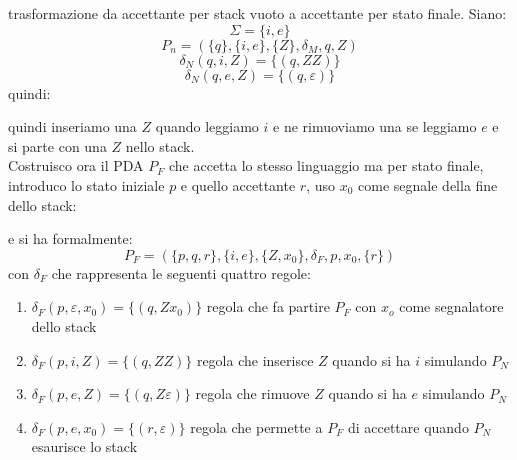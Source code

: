 \documentclass[a4paper,12pt, oneside]{book}
\begin{document}
\begin{esempio}
trasformazione da accettante per stack vuoto a accettante per stato finale. Siano:
$$\Sigma=\{i,e\}$$
$$P_n=(\{q\}, \{i,e\},\{Z\},\delta_M,q,Z)$$
$$\delta_N(q,i,Z)=\{(q,ZZ)\}$$
$$\delta_N(q,e,Z)=\{(q,\varepsilon)\}$$
quindi:
\begin{center}
\end{center}
quindi inseriamo una $Z$ quando leggiamo $i$ e ne rimuoviamo una se leggiamo $e$ e si parte con una $Z$ nello stack.\\
Costruisco ora il PDA $P_F$ che accetta lo stesso linguaggio ma per stato finale, introduco lo stato iniziale $p$ e quello  accettante $r$, uso $x_0$ come segnale della fine dello stack:
\begin{center}
\end{center}
e si ha formalmente:
$$P_F=(\{p,q,r\}, \{i,e\},\{Z,x_0\},\delta_F,p,x_0,\{r\})$$
con $\delta_F$ che rappresenta le seguenti quattro regole:
\begin{enumerate}
\item $\delta_F(p,\varepsilon,x_0)=\{(q,Zx_0)\}$ regola che fa partire $P_F$ con $x_o$ come segnalatore dello stack
\item $\delta_F(p,i,Z)=\{(q,ZZ)\}$ regola che inserisce $Z$ quando si ha $i$ simulando $P_N$
\item $\delta_F(p,e,Z)=\{(q,Z\varepsilon)\}$ regola che rimuove $Z$ quando si ha $e$ simulando $P_N$
\item $\delta_F(p,e,x_0)=\{(r,\varepsilon)\}$ regola che permette a $P_F$ di accettare quando $P_N$ esaurisce lo stack
\end{enumerate}
\end{esempio}
\end{document}
